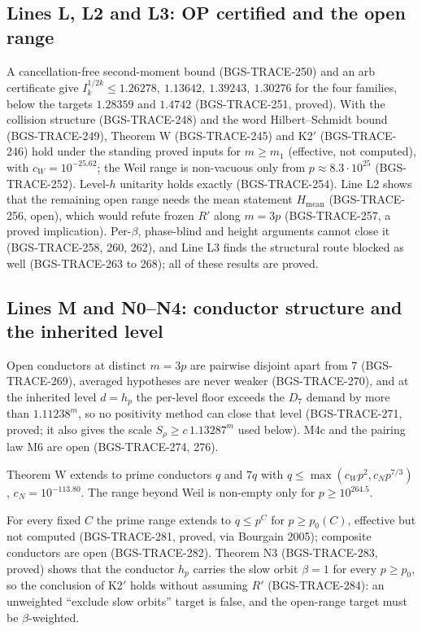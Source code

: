 \subsection{Lines L, L2 and L3: OP certified and the open range}
\label{sec:lines-I-N-lineL}
A cancellation-free second-moment bound (BGS-TRACE-250) and an arb certificate give \(I_k^{1/2k}\le1.26278,\ 1.13642,\ 1.39243,\ 1.30276\) for the four families, below the targets \(1.28359\) and \(1.4742\) (BGS-TRACE-251, proved). With the collision structure (BGS-TRACE-248) and the word Hilbert--Schmidt bound (BGS-TRACE-249), Theorem W (BGS-TRACE-245) and K2\('\) (BGS-TRACE-246) hold under the standing proved inputs for \(m\ge m_1\) (effective, not computed), with \(c_W=10^{-25.62}\); the Weil range is non-vacuous only from \(p\approx8.3\cdot10^{25}\) (BGS-TRACE-252). Level-\(h\) unitarity holds exactly (BGS-TRACE-254). Line L2 shows that the remaining open range needs the mean statement \(H_{\mathrm{mean}}\) (BGS-TRACE-256, open), which would refute frozen \(R'\) along \(m=3p\) (BGS-TRACE-257, a proved implication). Per-\(\beta\), phase-blind and height arguments cannot close it (BGS-TRACE-258, 260, 262), and Line L3 finds the structural route blocked as well (BGS-TRACE-263 to 268); all of these results are proved.

\subsection{Lines M and N0--N4: conductor structure and the inherited level}
\label{sec:lines-I-N-lineM}
Open conductors at distinct \(m=3p\) are pairwise disjoint apart from \(7\) (BGS-TRACE-269), averaged hypotheses are never weaker (BGS-TRACE-270), and at the inherited level \(d=h_p\) the per-level floor exceeds the \(D_7\) demand by more than \(1.11238^m\), so no positivity method can close that level (BGS-TRACE-271, proved; it also gives the scale \(S_\rho\ge c\,1.13287^m\) used below). M4c and the pairing law M6 are open (BGS-TRACE-274, 276).
\begin{theorem}
Theorem W extends to prime conductors \(q\) and \(7q\) with \(q\le\max(c_Wp^2,c_Np^{7/3})\), \(c_N=10^{-113.80}\). The range beyond Weil is non-empty only for \(p\ge10^{264.5}\).
\end{theorem}
For every fixed \(C\) the prime range extends to \(q\le p^C\) for \(p\ge p_0(C)\), effective but not computed (BGS-TRACE-281, proved, via Bourgain 2005); composite conductors are open (BGS-TRACE-282). Theorem N3 (BGS-TRACE-283, proved) shows that the conductor \(h_p\) carries the slow orbit \(\beta=1\) for every \(p\ge p_0\), so the conclusion of K2\('\) holds without assuming \(R'\) (BGS-TRACE-284): an unweighted ``exclude slow orbits'' target is false, and the open-range target must be \(\beta\)-weighted.

